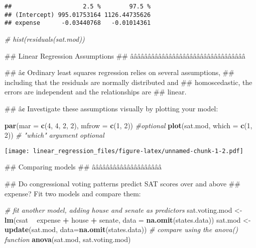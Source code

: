 \documentclass[]{article}
\newenvironment{Shaded}{\begin{snugshade}}{\end{snugshade}}
\newcommand{\KeywordTok}[1]{\textcolor[rgb]{0.13,0.29,0.53}{\textbf{#1}}}
\newcommand{\DataTypeTok}[1]{\textcolor[rgb]{0.13,0.29,0.53}{#1}}
\newcommand{\DecValTok}[1]{\textcolor[rgb]{0.00,0.00,0.81}{#1}}
\newcommand{\StringTok}[1]{\textcolor[rgb]{0.31,0.60,0.02}{#1}}
\newcommand{\CommentTok}[1]{\textcolor[rgb]{0.56,0.35,0.01}{\textit{#1}}}
\newcommand{\OperatorTok}[1]{\textcolor[rgb]{0.81,0.36,0.00}{\textbf{#1}}}
\newcommand{\NormalTok}[1]{#1}
\begin{document}
\begin{verbatim}
##                    2.5 %        97.5 %
## (Intercept) 995.01753164 1126.44735626
## expense      -0.03440768   -0.01014361
\end{verbatim}

\begin{Shaded}
\begin{Highlighting}[]
\CommentTok{# hist(residuals(sat.mod))}

\NormalTok{## Linear Regression Assumptions}
\NormalTok{## âââââââââââââââââââââââââââââââââ}

\NormalTok{##   â¢ Ordinary least squares regression relies on several assumptions,}
\NormalTok{##     including that the residuals are normally distributed and}
\NormalTok{##     homoscedastic, the errors are independent and the relationships are}
\NormalTok{##     linear.}

\NormalTok{##   â¢ Investigate these assumptions visually by plotting your model:}

\KeywordTok{par}\NormalTok{(}\DataTypeTok{mar =} \KeywordTok{c}\NormalTok{(}\DecValTok{4}\NormalTok{, }\DecValTok{4}\NormalTok{, }\DecValTok{2}\NormalTok{, }\DecValTok{2}\NormalTok{), }\DataTypeTok{mfrow =} \KeywordTok{c}\NormalTok{(}\DecValTok{1}\NormalTok{, }\DecValTok{2}\NormalTok{)) }\CommentTok{#optional}
\KeywordTok{plot}\NormalTok{(sat.mod, }\DataTypeTok{which =} \KeywordTok{c}\NormalTok{(}\DecValTok{1}\NormalTok{, }\DecValTok{2}\NormalTok{)) }\CommentTok{# "which" argument optional}
\end{Highlighting}
\end{Shaded}

\texttt{[image: linear\_regression\_files/figure-latex/unnamed-chunk-1-2.pdf]}

\begin{Shaded}
\begin{Highlighting}[]
\NormalTok{## Comparing models}
\NormalTok{## ââââââââââââââââââââ}

\NormalTok{##   Do congressional voting patterns predict SAT scores over and above}
\NormalTok{##   expense? Fit two models and compare them:}

\CommentTok{# fit another model, adding house and senate as predictors}
\NormalTok{sat.voting.mod <-}\StringTok{  }\KeywordTok{lm}\NormalTok{(csat }\OperatorTok{~}\StringTok{ }\NormalTok{expense }\OperatorTok{+}\StringTok{ }\NormalTok{house }\OperatorTok{+}\StringTok{ }\NormalTok{senate,}
                      \DataTypeTok{data =} \KeywordTok{na.omit}\NormalTok{(states.data))}
\NormalTok{sat.mod <-}\StringTok{ }\KeywordTok{update}\NormalTok{(sat.mod, }\DataTypeTok{data=}\KeywordTok{na.omit}\NormalTok{(states.data))}
\CommentTok{# compare using the anova() function}
\KeywordTok{anova}\NormalTok{(sat.mod, sat.voting.mod)}
\end{Highlighting}
\end{Shaded}
\end{document}
